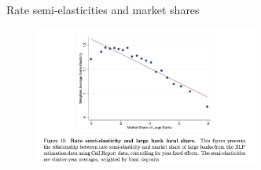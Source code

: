 \documentclass[notes,10pt, aspectratio=169]{beamer}
\begin{document}
    

    \begin{frame}{Rate semi-elasticities and market shares}

        \begin{figure}
            \centering
            \includegraphics[width=0.65\textwidth]{imgs/fig10.png}
        \end{figure}
        
\end{frame}
\end{document}
